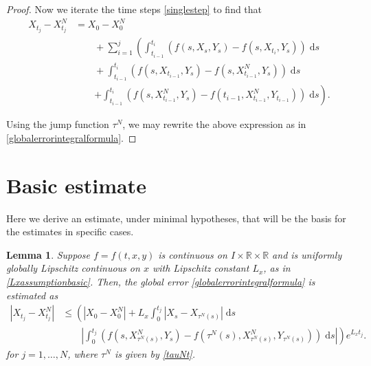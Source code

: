 \documentclass[reqno,12pt]{amsart}
\theoremstyle{plain}%
\newtheorem{lem}{Lemma}[section]
\theoremstyle{definition}
\begin{document}
\begin{proof}
Now we iterate the time steps \eqref{singlestep} to find that
\begin{align*}
    X_{t_j} - X_{t_j}^N & = X_0 - X_0^N \\
    & \qquad + \sum_{i=1}^{j} \left(\int_{t_{i-1}}^{t_i} \left( f(s, X_s, Y_s) - f(s, X_{t_{i}}, Y_s) \right)\;\mathrm{d}s \right. \\ 
    & \qquad + \int_{t_{i-1}}^{t_i} \left( f(s, X_{t_{i-1}}, Y_s) - f(s, X_{t_{i-1}}^N, Y_s) \right)\;\mathrm{d}s \\
    & \qquad \left. + \int_{t_{i-1}}^{t_i} \left( f(s, X_{t_{i-1}}^N, Y_s) - f(t_{i-1}, X_{t_{i-1}}^N, Y_{t_{i-1}}) \right)\;\mathrm{d}s \right).
\end{align*}

Using the jump function $\tau^N$, we may rewrite the above expression as in \eqref{globalerrorintegralformula}.
\end{proof}

\section{Basic estimate}

Here we derive an estimate, under minimal hypotheses, that will be the basis for the estimates in specific cases.

\begin{lem}
    \label{lembasicestimate}
    Suppose $f=f(t, x, y)$ is continuous on $I\times \mathbb{R}\times\mathbb{R}$ and is uniformly globally Lipschitz continuous on $x$ with Lipschitz constant $L_x$, as in \eqref{Lxassumptionbasic}. Then, the global error \eqref{globalerrorintegralformula} is estimated as
    \begin{equation}
        \label{Etjbasicbound}
        \begin{aligned}
            |X_{t_j} - X_{t_j}^N| & \leq \left( |X_0 - X_0^N| + L_x \int_0^{t_j} |X_s - X_{\tau^N(s)}| \;\mathrm{d}s \right. \\
            & \qquad \left. \left|\int_0^{t_j} \left( f(s, X_{\tau^N(s)}^N, Y_s) - f(\tau^N(s), X_{\tau^N(s)}^N, Y_{\tau^N(s)}) \right)\;\mathrm{d}s\right| \right) e^{L_x t_j}.
        \end{aligned}
    \end{equation}
    for $j=1, \ldots, N$, where $\tau^N$ is given by \eqref{tauNt}.
\end{lem}
\end{document}
